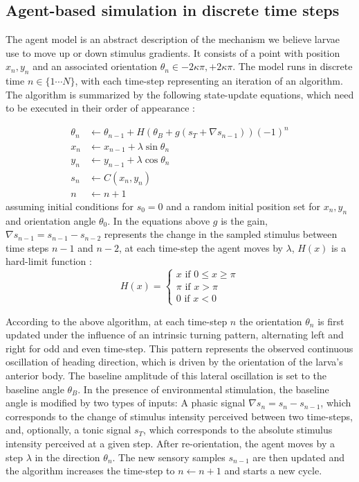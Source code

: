 \documentclass[11pt,a4paper]{article}
\begin{document}
\subsection{Agent-based simulation in discrete time steps}
\label{sec:methodsDiscreteAgent}
The agent model is an abstract description of the mechanism we believe larvae use to move up or down stimulus gradients. 
It consists of a point with position $x_n,y_n$ and an associated orientation $\theta_n \in {-2 \kappa \pi,+2 \kappa \pi}$. The model runs in discrete time $n \in \{1 \cdots N\}$, with each time-step representing an iteration of an algorithm.
The algorithm is summarized by the following state-update equations, which need to be executed in their order of appearance :

\begin{align}
\theta_{n} &\leftarrow \theta_{n-1} + H(\theta_B + g (s_{T} + \nabla s_{n-1})){(-1)}^n\\
x_n & \leftarrow x_{n-1}+ \lambda \sin \theta_{n} \\
y_n &\leftarrow y_{n-1}+ \lambda  \cos \theta_{n}\\
s_n &\leftarrow C(x_n,y_n)\\
n &\leftarrow n+1
\label{eqn:Discretemodel}
\end{align}
assuming initial conditions for $s_0 = 0$ and a random initial position set for $x_n,y_n$ and orientation angle $\theta_0$.
In the equations above $g$ is the gain, $\nabla s_{n-1}  = s_{n-1} - s_{n-2}$ represents the change in the sampled stimulus between time steps $n-1$ and $n-2$,  at each time-step the agent moves by $\lambda$,  $H(x)$ is a hard-limit function :
\begin{equation}
H(x) =
\begin{cases}
x \mbox{ if } 0 \leq x \geq \pi \\
\pi \mbox{ if } x > \pi  \\
0 \mbox{ if } x < 0 
\end{cases}
\label{eq:boundary}
\end{equation}

According to the above algorithm, at each time-step $n$ the orientation $\theta_n$ is first updated under the influence of an intrinsic  turning pattern, alternating left and right for odd and even time-step. 
This pattern represents the observed continuous oscillation of heading direction, which is driven by the orientation of the larva's anterior body.
 The baseline amplitude of this lateral oscillation is set to the baseline angle $\theta_B$.
  In the presence of environmental stimulation, the baseline angle is modified by two types of inputs: A phasic signal $\nabla s_{n}  = s_{n} - s_{n-1}$, which corresponds to the change of stimulus intensity perceived between two time-steps, and, optionally, a tonic signal $s_{T}$, which corresponds to the absolute stimulus intensity perceived at a given step.
After re-orientation, the agent moves by a step $\lambda$ in the direction $\theta_n$. The new sensory samples $s_{n-1}$ are then updated and the algorithm increases the time-step to $n  \leftarrow n+1$ and starts a new cycle.
\end{document}

